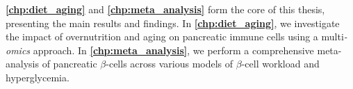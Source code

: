 \par \textbf{\autoref{chp:diet_aging}} and \textbf{\autoref{chp:meta_analysis}} form the core of this thesis, presenting the main results and findings. In \textbf{\autoref{chp:diet_aging}}, we investigate the impact of overnutrition and aging on pancreatic immune cells using a multi\textit{-omics} approach. In \textbf{\autoref{chp:meta_analysis}}, we perform a comprehensive meta-analysis of pancreatic $\beta$-cells across various models of $\beta$-cell workload and hyperglycemia.\\ %




